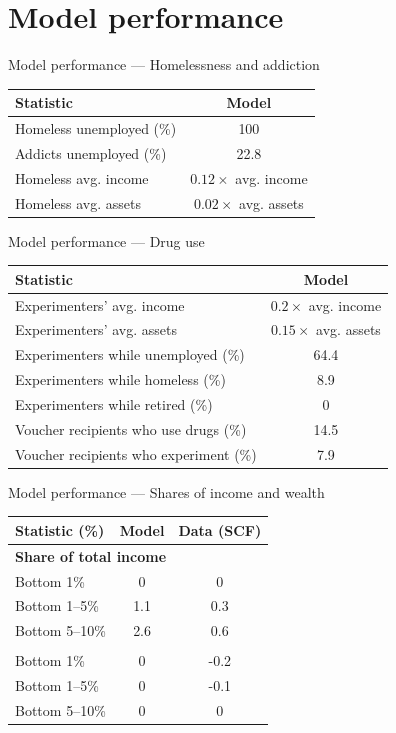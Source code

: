 \documentclass[10pt,aspectratio=169]{beamer}
\begin{document}
\section{Model performance}

\begin{frame}{Model performance --- Homelessness and addiction}
\small
\begin{table}
\centering
\begin{tabular}{lc}
\toprule
Statistic & Model\\
\midrule
Homeless unemployed (\%) & 100\\
Addicts unemployed (\%) & 22.8\\
Homeless avg. income & $0.12\times$ avg. income\\
Homeless avg. assets & $0.02\times$ avg. assets\\
\bottomrule
\end{tabular}
\end{table}
\end{frame}

\begin{frame}{Model performance --- Drug use}
\small
\begin{table}
\centering
\begin{tabular}{lc}
\toprule
Statistic & Model\\
\midrule
Experimenters' avg. income & $0.2\times$ avg. income\\
Experimenters' avg. assets & $0.15\times$ avg. assets\\
Experimenters while unemployed (\%) & 64.4\\
Experimenters while homeless (\%) & 8.9\\
Experimenters while retired (\%) & 0\\
Voucher recipients who use drugs (\%) & 14.5\\
Voucher recipients who experiment (\%) & 7.9\\
\bottomrule
\end{tabular}
\end{table}
\end{frame}

\begin{frame}{Model performance --- Shares of income and wealth}
\small
\begin{table}
\centering
\begin{tabular}{lcc}
\toprule
Statistic (\%) & Model & Data (SCF)\\
\midrule
\multicolumn{3}{l}{\textbf{Share of total income}}\\
Bottom 1\% & 0 & 0\\
Bottom 1--5\% & 1.1 & 0.3\\
Bottom 5--10\% & 2.6 & 0.6\\
\addlinespace
\multicolumn{3}{l}{\textbf{Share of total net wealth}}\\
Bottom 1\% & 0 & -0.2\\
Bottom 1--5\% & 0 & -0.1\\
Bottom 5--10\% & 0 & 0\\
\bottomrule
\end{tabular}
\end{table}
\end{frame}
\end{document}
